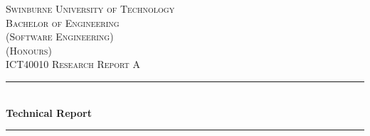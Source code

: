\usepackage[dvipsnames]{xcolor}

\usepackage{hyperref}
\hypersetup{
    colorlinks=true,
    allcolors=FuchsiaPink,
}

\usepackage{fontspec}
\newfontface{}
\newcommand{\emoji}[1]{{\emojifont{#1}}}





\begin{titlepage} %
  \newcommand{\HRule}{\rule{\linewidth}{0.5mm}} %

  \center{} %


  \textsc{\LARGE Swinburne University of Technology}\\[1.5cm]

  \textsc{
    \Large
    Bachelor of Engineering\\
    (Software Engineering)\\
    (Honours)
  }\\[0.5cm]

  \textsc{\large ICT40010 Research Report A}\\[0.5cm]


  \HRule{}\\[0.4cm]

  {\huge\bfseries Technical Report}\\[0.2cm]

  \HRule{}\\[1.5cm]



\end{titlepage}
